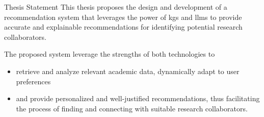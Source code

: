 \begin{tframe}{Thesis Statement}
This thesis proposes the design and development of a recommendation system that leverages the power of \glspl{kg} and \glspl{llm} to provide accurate and explainable recommendations for identifying potential research collaborators.
\vspace{.5cm}

The proposed system leverage the strengths of both technologies to
\begin{itemize}
    \item retrieve and analyze relevant academic data, dynamically adapt to user preferences
    \item and provide personalized and well-justified recommendations, thus facilitating the process of finding and connecting with suitable research collaborators.
\end{itemize}
\end{tframe}